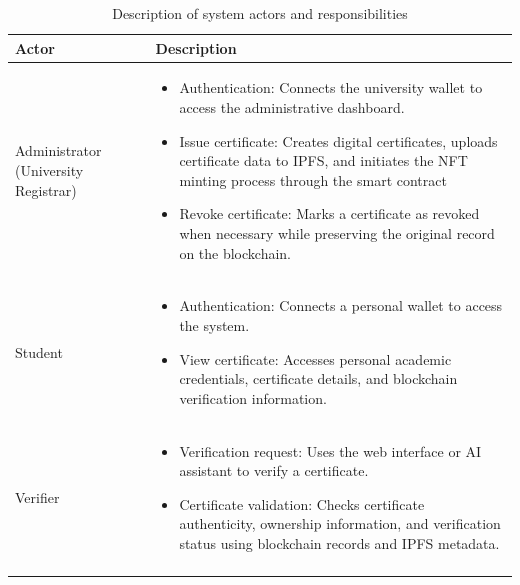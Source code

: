 

\begin{longtable}{|m{3.5cm}|m{10.5cm}|}
    \hline
    \textbf{Actor} & \textbf{Description}                                                                                                                                     \\
    \hline
    \endfirsthead

    Administrator (University Registrar)
                   & \begin{itemize}
                         \item Authentication: Connects the university wallet to access the administrative dashboard.

                         \item Issue certificate: Creates digital certificates, uploads certificate data to IPFS, and initiates the NFT minting process through the smart contract

                         \item Revoke certificate: Marks a certificate as revoked when necessary while preserving the original record on the blockchain.
                     \end{itemize} \\
    \hline

    Student
                   & \begin{itemize}
                         \item Authentication: Connects a personal wallet to access the system.

                         \item View certificate: Accesses personal academic credentials, certificate details, and blockchain verification information.
                     \end{itemize}                             \\
    \hline

    Verifier
                   & \begin{itemize}
                         \item Verification request: Uses the web interface or AI assistant to verify a certificate.

                         \item Certificate validation: Checks certificate authenticity, ownership information, and verification status using blockchain records and IPFS metadata.
                     \end{itemize} \\
    \hline


    \caption{Description of system actors and responsibilities}
    \label{tab:usecase_diagram_explain}
\end{longtable}